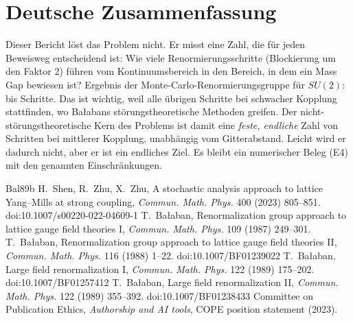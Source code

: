 \documentclass[11pt,a4paper]{article}
\begin{document}
\appendix
\section{Deutsche Zusammenfassung}
Dieser Bericht löst das Problem nicht. Er misst eine Zahl, die für jeden Beweisweg entscheidend ist: Wie viele Renormierungsschritte (Blockierung um den Faktor 2) führen vom Kontinuumsbereich in den Bereich, in dem ein Mass Gap bewiesen ist? Ergebnis der Monte-Carlo-Renormierungsgruppe für $SU(2)$: \BridgeStepsMin{} bis \BridgeStepsMax{} Schritte. Das ist wichtig, weil alle übrigen Schritte bei schwacher Kopplung stattfinden, wo Ba{\l}abans störungstheoretische Methoden greifen. Der nicht-störungstheoretische Kern des Problems ist damit eine \emph{feste, endliche} Zahl von Schritten bei mittlerer Kopplung, unabhängig vom Gitterabstand. Leicht wird er dadurch nicht, aber er ist ein endliches Ziel. Es bleibt ein numerischer Beleg (E4) mit den genannten Einschränkungen.

\begin{thebibliography}{Bal89b}
\small
{} H.~Shen, R.~Zhu, X.~Zhu, A stochastic analysis approach to lattice Yang--Mills at strong coupling, \emph{Commun. Math. Phys.} 400 (2023) 805--851. doi:10.1007/s00220-022-04609-1
 T.~Ba{\l}aban, Renormalization group approach to lattice gauge field theories I, \emph{Commun. Math. Phys.} 109 (1987) 249--301.
 T.~Ba{\l}aban, Renormalization group approach to lattice gauge field theories II, \emph{Commun. Math. Phys.} 116 (1988) 1--22. doi:10.1007/BF01239022
 T.~Ba{\l}aban, Large field renormalization I, \emph{Commun. Math. Phys.} 122 (1989) 175--202. doi:10.1007/BF01257412
 T.~Ba{\l}aban, Large field renormalization II, \emph{Commun. Math. Phys.} 122 (1989) 355--392. doi:10.1007/BF01238433
 Committee on Publication Ethics, \emph{Authorship and AI tools}, COPE position statement (2023).
\end{thebibliography}
\end{document}
